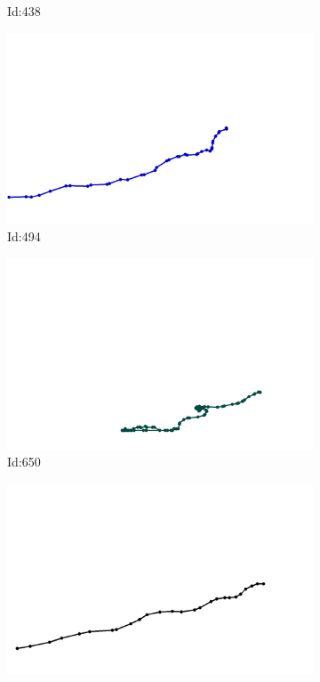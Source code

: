 \documentclass[12pt,twoside]{report}
\begin{document}
\begin{figure}
\begin{subfigure}[b]{0.20\textwidth}
\caption{Id:438}
\end{subfigure}
\begin{subfigure}[b]{0.20\textwidth}
\centering
\includegraphics[width=\textwidth]{../trajectories/494.png}
\caption{Id:494}
\end{subfigure}
\begin{subfigure}[b]{0.20\textwidth}
\centering
\includegraphics[width=\textwidth]{../trajectories/650.png}
\caption{Id:650}
\end{subfigure}
\begin{subfigure}[b]{0.20\textwidth}
\centering
\includegraphics[width=\textwidth]{../trajectories/654.png}

\end{subfigure}
\end{figure}
\end{document}
